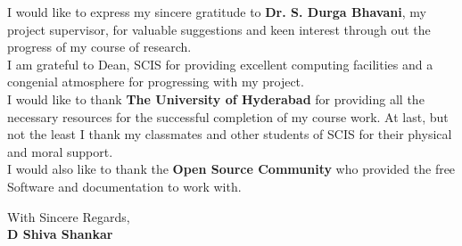 I would like to express my sincere gratitude to {\bf Dr. S. Durga Bhavani}, my project supervisor, 
for valuable suggestions and keen interest through out the progress of my course of research. \\

I am grateful to Dean, SCIS for providing excellent computing facilities 
and a congenial atmosphere for progressing with my project. \\


I would like to thank {\bf The University of Hyderabad} for providing all the necessary resources 
for the successful completion of my course work. At last, but not the least I thank my classmates and 
other students of SCIS for their physical and moral support. \\

I would also like to thank the {\bf Open Source Community} who provided the free Software and documentation to work with.

\vspace{0.7in}

\begin{flushright}
With Sincere Regards,\\
{\bf D Shiva Shankar}
\end{flushright}

